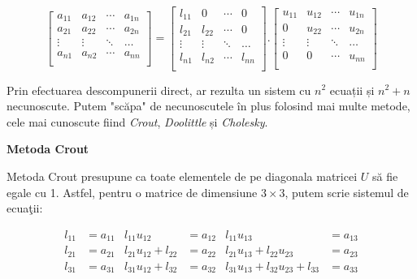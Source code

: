 \documentclass{exam}
\begin{document}
\begin{equation*}
	\begin{bmatrix}
		a_{11} & a_{12} & \cdots & a_{1n} \\
		a_{21} & a_{22} & \cdots & a_{2n} \\
		\vdots & \vdots & \ddots & \dots  \\
		a_{n1} & a_{n2} & \cdots & a_{nn} \\
	\end{bmatrix} =
	\begin{bmatrix}
		l_{11} & 0      & \cdots & 0      \\
		l_{21} & l_{22} & \cdots & 0      \\
		\vdots & \vdots & \ddots & \dots  \\
		l_{n1} & l_{n2} & \cdots & l_{nn} \\
	\end{bmatrix} .
	\begin{bmatrix}
		u_{11} & u_{12} & \cdots & u_{1n} \\
		0      & u_{22} & \cdots & u_{2n} \\
		\vdots & \vdots & \ddots & \dots  \\
		0      & 0      & \cdots & u_{nn} \\
	\end{bmatrix}
\end{equation*}

\par Prin efectuarea descompunerii direct, ar rezulta un sistem cu $n^2$
ecuații și $n^2 + n$ necunoscute. Putem "scăpa" de necunoscutele în plus
folosind mai multe metode, cele mai cunoscute fiind \textit{Crout},
\textit{Doolittle} și \textit{Cholesky}.

\textbf{Metoda Crout}

\par Metoda Crout presupune ca toate elementele de pe diagonala matricei $U$ să
fie egale cu 1. Astfel, pentru o matrice de dimensiune $3 \times 3$, putem scrie sistemul de
ecuaţii:

\begin{align*}
	l_{11} & = a_{11} & l_{11}u_{12}          & = a_{12} & l_{11}u_{13}                         & = a_{13} \\
	l_{21} & = a_{21} & l_{21}u_{12} + l_{22} & = a_{22} & l_{21}u_{13} + l_{22}u_{23}          & = a_{23} \\
	l_{31} & = a_{31} & l_{31}u_{12} + l_{32} & = a_{32} & l_{31}u_{13} + l_{32}u_{23} + l_{33} & = a_{33}
\end{align*}
\end{document}
